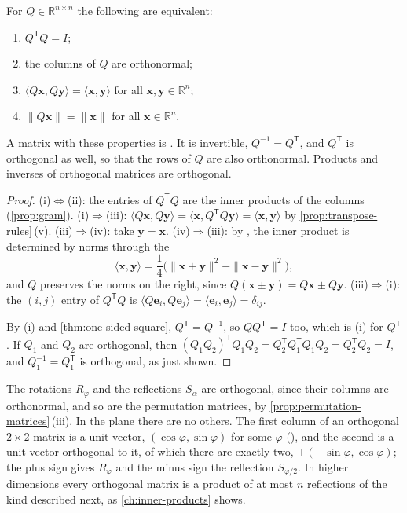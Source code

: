 \begin{theorem}
\label{thm:orthogonal}
For $Q\in\mathbb R^{n\times n}$ the following are equivalent:
\begin{enumerate}
\item $Q^{\mathsf T}Q=I$;
\item the columns of $Q$ are orthonormal;
\item $\langle Q\mathbf x,Q\mathbf y\rangle=\langle\mathbf x,\mathbf y\rangle$ for all $\mathbf x,\mathbf y\in\mathbb R^n$;
\item $\|Q\mathbf x\|=\|\mathbf x\|$ for all $\mathbf x\in\mathbb R^n$.
\end{enumerate}
A matrix with these properties is . It is invertible, $Q^{-1}=Q^{\mathsf T}$, and $Q^{\mathsf T}$ is orthogonal as well, so that the rows of $Q$ are also orthonormal. Products and inverses of orthogonal matrices are orthogonal.
\end{theorem}

\begin{proof}
(i)$\Leftrightarrow$(ii): the entries of $Q^{\mathsf T}Q$ are the inner products of the columns (\cref{prop:gram}). (i)$\Rightarrow$(iii): $\langle Q\mathbf x,Q\mathbf y\rangle=\langle\mathbf x,Q^{\mathsf T}Q\mathbf y\rangle=\langle\mathbf x,\mathbf y\rangle$ by \cref{prop:transpose-rules}\,(v). (iii)$\Rightarrow$(iv): take $\mathbf y=\mathbf x$. (iv)$\Rightarrow$(iii): by , the inner product is determined by norms through the 
\[
\langle\mathbf x,\mathbf y\rangle=\frac14\bigl(\|\mathbf x+\mathbf y\|^2-\|\mathbf x-\mathbf y\|^2\bigr),
\]
and $Q$ preserves the norms on the right, since $Q(\mathbf x\pm\mathbf y)=Q\mathbf x\pm Q\mathbf y$. (iii)$\Rightarrow$(i): the $(i,j)$ entry of $Q^{\mathsf T}Q$ is $\langle Q\mathbf e_i,Q\mathbf e_j\rangle=\langle\mathbf e_i,\mathbf e_j\rangle=\delta_{ij}$.

By (i) and \cref{thm:one-sided-square}, $Q^{\mathsf T}=Q^{-1}$, so $QQ^{\mathsf T}=I$ too, which is (i) for $Q^{\mathsf T}$. If $Q_1$ and $Q_2$ are orthogonal, then $(Q_1Q_2)^{\mathsf T}Q_1Q_2=Q_2^{\mathsf T}Q_1^{\mathsf T}Q_1Q_2=Q_2^{\mathsf T}Q_2=I$, and $Q_1^{-1}=Q_1^{\mathsf T}$ is orthogonal, as just shown.
\end{proof}

The rotations $R_\varphi$ and the reflections $S_\alpha$ are orthogonal, since their columns are orthonormal, and so are the permutation matrices, by \cref{prop:permutation-matrices}\,(iii). In the plane there are no others. The first column of an orthogonal $2\times2$ matrix is a unit vector, $(\cos\varphi,\sin\varphi)$ for some $\varphi$ (), and the second is a unit vector orthogonal to it, of which there are exactly two, $\pm(-\sin\varphi,\cos\varphi)$; the plus sign gives $R_\varphi$ and the minus sign the reflection $S_{\varphi/2}$. In higher dimensions every orthogonal matrix is a product of at most $n$ reflections of the kind described next, as \cref{ch:inner-products} shows.

